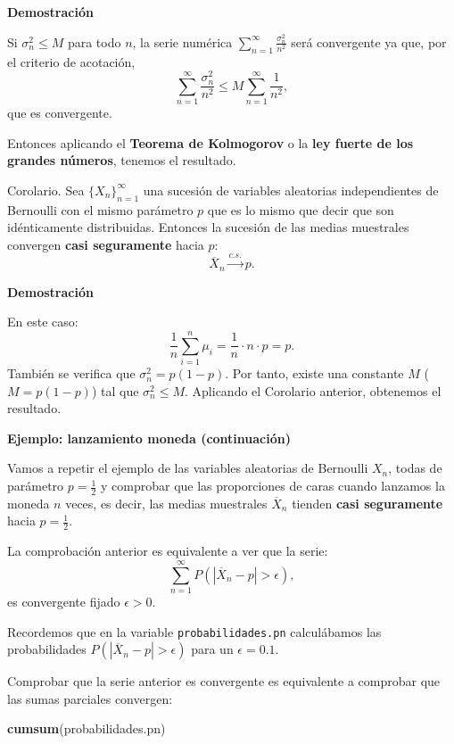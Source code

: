 \documentclass[]{book}
\newenvironment{Shaded}{\begin{snugshade}}{\end{snugshade}}
\newcommand{\KeywordTok}[1]{\textcolor[rgb]{0.13,0.29,0.53}{\textbf{#1}}}
\newcommand{\NormalTok}[1]{#1}
\begin{document}
\textbf{Demostración}

Si \(\sigma_n^2\leq M\) para todo \(n\), la serie numérica \(\sum\limits_{n=1}^\infty \frac{\sigma_n^2}{n^2}\) será convergente ya que, por el criterio de acotación,
\[
\sum\limits_{n=1}^\infty \frac{\sigma_n^2}{n^2}\leq M\sum\limits_{n=1}^\infty \frac{1}{n^2},
\]
que es convergente.

Entonces aplicando el \textbf{Teorema de Kolmogorov} o la \textbf{ley fuerte de los grandes números}, tenemos el resultado.

Corolario.
Sea \(\{X_n\}_{n=1}^\infty\) una sucesión de variables aleatorias independientes de Bernoulli con el mismo parámetro \(p\) que es lo mismo que decir que son idénticamente distribuidas.
Entonces la sucesión de las medias muestrales convergen \textbf{casi seguramente} hacia \(p\):
\[
\overline{X}_n \stackrel{c.s.}{\longrightarrow} p.
\]

\textbf{Demostración}

En este caso:
\[
\frac{1}{n}\sum_{i=1}^n \mu_i = \frac{1}{n}\cdot n\cdot p=p.
\]
También se verifica que \(\sigma_n^2 =p(1-p)\). Por tanto, existe una constante \(M\) (\(M=p(1-p)\)) tal que \(\sigma_n^2\leq M\). Aplicando el Corolario anterior, obtenemos el resultado.

\textbf{Ejemplo: lanzamiento moneda (continuación)}

Vamos a repetir el ejemplo de las variables aleatorias de Bernoulli \(X_n\), todas de parámetro \(p=\frac{1}{2}\) y comprobar que las proporciones de caras cuando lanzamos la moneda \(n\) veces, es decir, las medias muestrales \(\overline{X}_n\) tienden \textbf{casi seguramente} hacia \(p=\frac{1}{2}\).

La comprobación anterior es equivalente a ver que la serie:
\[
\sum_{n=1}^\infty P(|\overline{X}_n-p|>\epsilon),
\]
es convergente fijado \(\epsilon >0\).

Recordemos que en la variable \texttt{probabilidades.pn} calculábamos las probabilidades \(P(|\overline{X}_n-p|>\epsilon)\) para un \(\epsilon =0.1\).

Comprobar que la serie anterior es convergente es equivalente a comprobar que las sumas parciales convergen:

\begin{Shaded}
\begin{Highlighting}[]
\KeywordTok{cumsum}\NormalTok{(probabilidades.pn)}
\end{Highlighting}
\end{Shaded}
\end{document}
